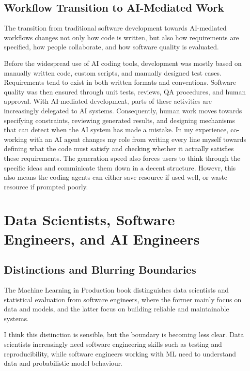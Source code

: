 \documentclass[11pt,a4paper]{article}
\begin{document}
\subsection{Workflow Transition to AI-Mediated Work}

The transition from traditional software development towards AI-mediated workflows changes not only how code is written, but also how requirements are specified, how people collaborate, and how software quality is evaluated.

Before the widespread use of AI coding tools, development was mostly based on manually written code, custom scripts, and manually designed test cases. Requirements tend to exist in both written formats and conventions. Software quality was then ensured through unit tests, reviews, QA procedures, and human approval. With AI-mediated development, parts of these activities are increasingly delegated to AI systems. Consequently, human work moves towards specifying constraints, reviewing generated results, and designing mechanisms that can detect when the AI system has made a mistake. In my experience, co-working with an AI agent changes my role from writing every line myself towards defining what the code must satisfy and checking whether it actually satisfies these requirements. The generation speed also forces users to think through the specific ideas and comminicate them down in a decent structure. Howevr, this also means the coding agents can either save resource if used well, or waste resource if prompted poorly.



\section{Data Scientists, Software Engineers, and AI Engineers}

\subsection{Distinctions and Blurring Boundaries}

The Machine Learning in Production book distinguishes data scientists and statistical evaluation from software engineers, where the former mainly focus on data and models, and the latter focus on building reliable and maintainable systems.

I think this distinction is sensible, but the boundary is becoming less clear. Data scientists increasingly need software engineering skills such as testing and reproducibility, while software engineers working with ML need to understand data and probabilistic model behaviour.
\end{document}
